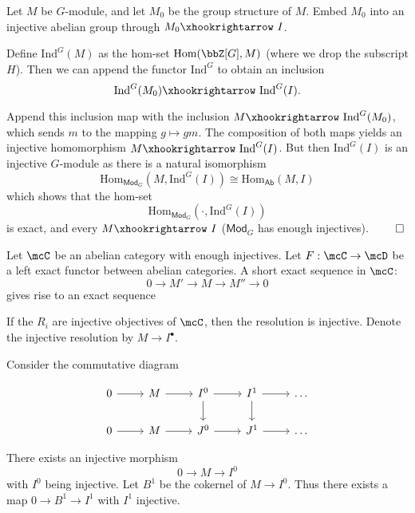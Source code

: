 \documentclass[a4paper, 12pt,oneside,openany]{book}
\begin{document}
Let $M$ be $G$-module, and let $M_0$ be the group structure of $M$. Embed $M_0$ into an injective abelian group through $M_0 \xhookrightarrow\ I$. 

Define $\text{Ind}^G(M)$ as the hom-set $\text{Hom}(\bbZ[G], M)$ (where we drop the subscript $H$). Then we can append the functor $\text{Ind}^G$ to obtain an inclusion $$\text{Ind}^G(M_0) \xhookrightarrow\ \text{Ind}^G(I).$$

Append this inclusion map with the inclusion $M \xhookrightarrow\ \text{Ind}^G(M_0)$, which sends $m$ to the mapping $g \mapsto gm$. The composition of both maps yields an injective homomorphism $M \xhookrightarrow\ \text{Ind}^G(I)$. But then $\text{Ind}^G(I)$ is an injective $G$-module as there is a natural isomorphism $$\text{Hom}_{\textsf{Mod}_G}(M, \text{Ind}^G(I)) \cong \text{Hom}_{\textsf{Ab}}(M, I)$$ which shows that the hom-set $$\text{Hom}_{\textsf{Mod}_G}(\cdot, \text{Ind}^G(I))$$ is exact, and every $M \xhookrightarrow\ I$ ($\textsf{Mod}_G$ has enough injectives). $\qed$

Let $\mcC$ be an abelian category with enough injectives. Let $F: \mcC \to \mcD$ be a left exact functor between abelian categories. A short exact sequence in $\mcC$: $$0 \to M' \to M \to M'' \to 0$$ gives rise to an exact sequence 


If the $R_i$ are injective objectives of $\mcC$, then the resolution is injective. Denote the injective resolution by $M \to I^\bullet$. 


 Consider the commutative diagram 

\[
\begin{tikzcd}
0 \arrow{r} &M \arrow{r}& I^0 \arrow{r} \arrow{d} &I^1 \arrow{r} \arrow{d} &\dots \\
0 \arrow{r} &M \arrow{r} &J^0 \arrow{r} &J^1 \arrow{r} &\dots
\end{tikzcd}
\]

There exists an injective morphism $$0 \to M \to I^0$$ with $I^0$ being injective. Let $B^1$ be the cokernel of $M \to I^0$. Thus there exists a map $0 \to B^1 \to I^1$ with $I^1$ injective.
\end{document}
